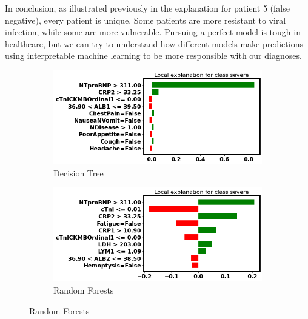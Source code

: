 In conclusion, as illustrated previously in the explanation for patient 5 (false negative), every patient is unique. Some patients are more resistant to viral infection, while some are more vulnerable. Pursuing a perfect model is tough in healthcare, but we can try to understand how different models make predictions using interpretable machine learning to be more responsible with our diagnoses.

\clearpage

\null
\vfill

\begin{figure}[H]
\centering
\begin{subfigure}[b]{\textwidth}
    \centering
    \includegraphics[width=\textwidth]{figures/chapter_interp/lime_dt_2.png}
    \caption{Decision Tree}
    \label{fig:lime_dt_2}
\end{subfigure}
\hfill
\begin{subfigure}[b]{\textwidth}
    \centering
    \includegraphics[width=\textwidth]{figures/chapter_interp/lime_rf_2.png}
    \caption{Random Forests}
    \label{fig:lime_rf_2}
\end{subfigure}
\end{figure}
\vfill

\clearpage

\null
\vfill

